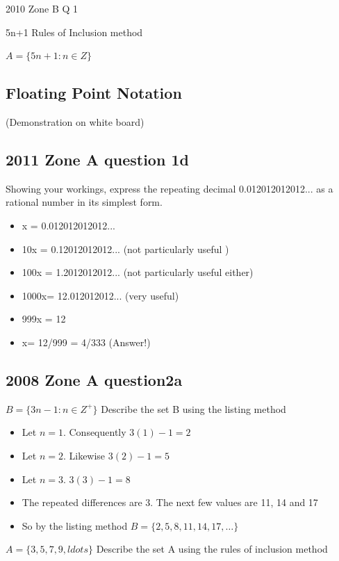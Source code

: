 \documentclass{article}
\begin{document}
2010 Zone B Q 1

5n+1 Rules of Inclusion method

$A = \{5n+1: n \in Z \}$
\subsection*{Floating Point Notation}
(Demonstration on white board)

\subsection*{2011 Zone A question 1d}

Showing your workings, express the repeating decimal 0.012012012012...
as a rational number in its simplest form.


\begin{itemize}
\item x = 0.012012012012...
\item 10x = 0.12012012012... (not particularly useful )
\item 100x = 1.2012012012... (not particularly useful either)
\item 1000x= 12.012012012... (very useful)
\item 999x = 12
\item x= 12/999 = 4/333 (Answer!)
\end{itemize}


\subsection*{2008  Zone A question2a}
$B = \{3n-1 :n \in Z^{+} \}$
Describe the set B using the listing method

\begin{itemize}
	\item Let $n=1$. Consequently $3(1)-1 =2$
	\item Let $n=2$. Likewise $3(2)-1 =5$
	\item Let $n=3$. $3(3)-1 = 8 $
	\item The repeated differences are 3. The next few values are 11, 14 and 17
	\item So by the listing method $B= \{2,5,8,11,14,17,\ldots\}$
\end{itemize}

$A = \{3,5,7,9,ldots \}$
Describe the set A using the rules of inclusion method
\end{document}
